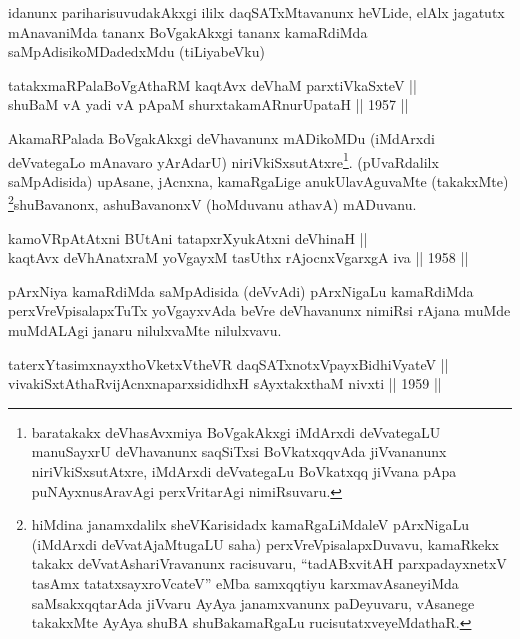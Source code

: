 \begin{artha}
idanunx pariharisuvudakAkxgi ililx daqSATxMtavanunx heVLide, elAlx
jagatutx mAnavaniMda tananx BoVgakAkxgi tananx kamaRdiMda
saMpAdisikoMDadedxMdu (tiLiyabeVku)
\end{artha}

\begin{shl}
tatakxmaRPalaBoVgAthaRM kaqtAvx deVhaM parxtiVkaSxteV ||  \\
shuBaM vA yadi vA pApaM shurxtakamARnurUpataH \hfill || 1957 ||
  
\end{shl}

\begin{artha}
AkamaRPalada BoVgakAkxgi deVhavanunx mADikoMDu (iMdArxdi deVvategaLo
mAnavaro yArAdarU) niriVkiSxsutAtxre\footnote{baratakakx
deVhasAvxmiya BoVgakAkxgi iMdArxdi deVvategaLU manuSayxrU
deVhavanunx saqSiTxsi BoVkatxqqvAda jiVvananunx niriVkiSxsutAtxre,
iMdArxdi deVvategaLu BoVkatxqq jiVvana pApa puNAyxnusAravAgi
perxVritarAgi nimiRsuvaru.}. (pUvaRdalilx
saMpAdisida) upAsane, jAcnxna, kamaRgaLige anukUlavAguvaMte
(takakxMte) \footnote{hiMdina janamxdalilx sheVKarisidadx kamaRgaLiMdaleV pArxNigaLu (iMdArxdi deVvatAjaMtugaLU saha) perxVreVpisalapxDuvavu, kamaRkekx takakx deVvatAshariVravanunx racisuvaru, ``tadABxvitAH parxpadayxnetxV tasAmx tatatxsayxroVcateV'' eMba samxqqtiyu karxmavAsaneyiMda saMsakxqqtarAda jiVvaru AyAya janamxvanunx paDeyuvaru, vAsanege takakxMte AyAya shuBA shuBakamaRgaLu rucisutatxveyeMdathaR.}shuBavanonx, ashuBavanonxV (hoMduvanu athavA) mADuvanu.
\end{artha}

\begin{shl}
kamoVRpAtAtxni BUtAni tatapxrXyukAtxni deVhinaH || \\
kaqtAvx deVhAnatxraM yoVgayxM tasUthx rAjocnxV\s garxgA iva \hfill || 1958 ||
  
\end{shl}

\begin{artha}
pArxNiya kamaRdiMda saMpAdisida (deVvAdi) pArxNigaLu kamaRdiMda
perxVreVpisalapxTuTx yoVgayxvAda beVre deVhavanunx nimiRsi rAjana
muMde muMdALAgi janaru nilulxvaMte nilulxvavu.
\end{artha}

\begin{shl}
taterxYtasimxnayxthoVketxV\s theVR daqSATxnotxV\s payxBidhiVyateV ||  \\
vivakiSxtAthaRvijAcnxnaparxsididhxH sAyxtakxthaM nivxti \hfill || 1959 ||
  
\end{shl}


